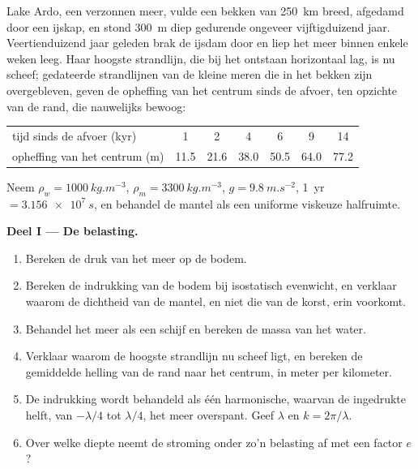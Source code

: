 \begin{problem}
\label{pb:b3:mantle-convection:1}
Lake Ardo, een verzonnen meer, vulde een bekken van \qty{250}{km} breed, afgedamd door een
ijskap, en stond \qty{300}{m} diep gedurende ongeveer vijftigduizend jaar.
Veertienduizend jaar geleden brak de ijsdam door en liep het meer binnen enkele weken leeg.
Haar hoogste strandlijn, die bij het ontstaan horizontaal lag, is nu scheef; gedateerde strandlijnen van
de kleine meren die in het bekken zijn overgebleven, geven de opheffing van het centrum sinds de
afvoer, ten opzichte van de rand, die nauwelijks bewoog:

\smallskip
\begin{center}\small
\begin{tabular}{lcccccc}
\hline
tijd sinds de afvoer (kyr) & 1 & 2 & 4 & 6 & 9 & 14\\
opheffing van het centrum (m) & 11.5 & 21.6 & 38.0 & 50.5 & 64.0 & 77.2\\
\hline
\end{tabular}
\end{center}
\smallskip

Neem $\rho_w = \qty{1000}{kg.m^{-3}}$, $\rho_m = \qty{3300}{kg.m^{-3}}$, $g =
\qty{9.8}{m.s^{-2}}$, \qty{1}{yr} $= \qty{3.156e7}{s}$, en behandel de mantel als
een uniforme viskeuze halfruimte.

\medskip\noindent\textbf{Deel I --- De belasting.}
\begin{enumerate}
  \item Bereken de druk van het meer op de bodem.
  \item Bereken de indrukking van de bodem bij isostatisch evenwicht, en verklaar
        waarom de dichtheid van de mantel, en niet die van de korst, erin voorkomt.
  \item Behandel het meer als een schijf en bereken de massa van het water.
  \item Verklaar waarom de hoogste strandlijn nu scheef ligt, en bereken de
        gemiddelde helling van de rand naar het centrum, in meter per kilometer.
  \item De indrukking wordt behandeld als één harmonische, waarvan de ingedrukte helft, van
        $-\lambda/4$ tot $\lambda/4$, het meer overspant. Geef $\lambda$ en $k =
        2\pi/\lambda$.
  \item Over welke diepte neemt de stroming onder zo'n belasting af met een factor
        $e$?
\end{enumerate}


\end{problem}
